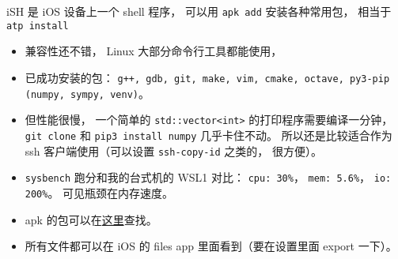 

\begin{issues}
\issueDraft
\end{issues}

iSH 是 iOS 设备上一个 shell 程序， 可以用 \verb|apk add| 安装各种常用包， 相当于 \verb|atp install|

\begin{itemize}
\item 兼容性还不错， Linux 大部分命令行工具都能使用，
\item 已成功安装的包： \verb|g++, gdb, git, make, vim, cmake, octave, py3-pip (numpy, sympy, venv)|。
\item 但性能很慢， 一个简单的 \verb|std::vector<int>| 的打印程序需要编译一分钟， \verb|git clone| 和 \verb|pip3 install numpy| 几乎卡住不动。 所以还是比较适合作为 ssh 客户端使用（可以设置 \verb|ssh-copy-id| 之类的， 很方便）。
\item \verb|sysbench| 跑分和我的台式机的 WSL1 对比： \verb|cpu: 30%|， \verb|mem: 5.6%|， \verb|io: 200%|。 可见瓶颈在内存速度。
\item apk 的包可以在\href{https://pkgs.alpinelinux.org/}{这里}查找。
\item 所有文件都可以在 iOS 的 files app 里面看到（要在设置里面 export 一下）。
\end{itemize}
